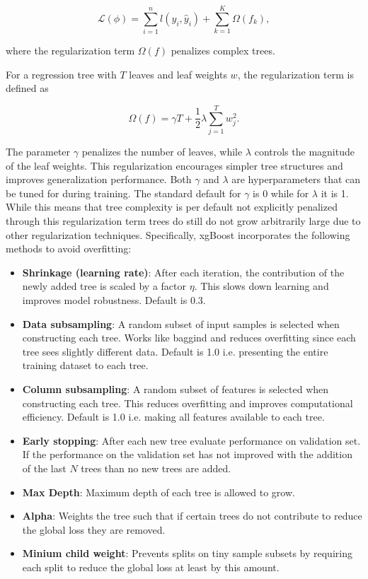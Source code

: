 \[
\mathcal{L}(\phi) =
\sum_{i=1}^{n} l(y_i, \hat{y}_i) +
\sum_{k=1}^{K} \Omega(f_k),
\]

where the regularization term $\Omega(f)$ penalizes complex trees.

For a regression tree with $T$ leaves and leaf weights $w$, the regularization term is defined as

\[
\Omega(f) = \gamma T + \frac{1}{2}\lambda \sum_{j=1}^{T} w_j^2.
\]

The parameter $\gamma$ penalizes the number of leaves, while $\lambda$ controls the magnitude of the leaf weights. This regularization encourages simpler tree structures and improves generalization performance. Both $\gamma$ and $\lambda$ are hyperparameters that can be tuned for during training. The standard default for $\gamma$ is 0 while for $\lambda$ it is 1. While this means that tree complexity is per default not explicitly penalized through this regularization term trees do still do not grow arbitrarily large due to other regularization techniques. Specifically, \gls{xgBoost} incorporates the following methods to avoid overfitting:

\begin{itemize}
\item \textbf{Shrinkage (learning rate)}: After each iteration, the contribution of the newly added tree is scaled by a factor $\eta$. This slows down learning and improves model robustness. Default is 0.3.
\item \textbf{Data subsampling}: A random subset of input samples is selected when constructing each tree. Works like baggind and reduces overfitting since each tree sees slightly different data. Default is 1.0 i.e. presenting the entire training dataset to each tree. 
\item \textbf{Column subsampling}: A random subset of features is selected when constructing each tree. This reduces overfitting and improves computational efficiency. Default is 1.0 i.e. making all features available to each tree.
\item \textbf{Early stopping}: After each new tree evaluate performance on validation set. If the performance on the validation set has not improved with the addition of the last $N$ trees than no new trees are added.
\item \textbf{Max Depth}: Maximum depth of each tree is allowed to grow.
\item \textbf{Alpha}: Weights the tree such that if certain trees do not contribute to reduce the global loss they are removed.
\item \textbf{Minium child weight}: Prevents splits on tiny sample subsets by requiring each split to reduce the global loss at least by this amount. 
\end{itemize}

